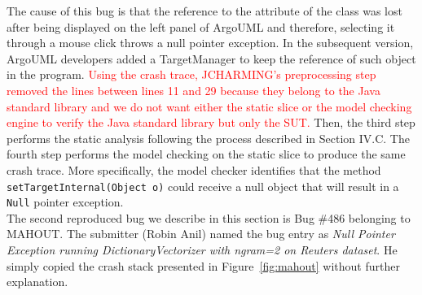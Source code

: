 \documentclass[times, doublespace]{smrauth}
\newcommand{\red}[1]{\textcolor{red}{#1}}
\begin{document}
The cause of this bug is that the reference to the attribute of
the class was lost after being displayed on the left panel of
ArgoUML and therefore, selecting it through a mouse click
throws a null pointer exception. In the subsequent version,
ArgoUML developers added a TargetManager to keep the
reference of such object in the program. \red{Using the crash trace, JCHARMING's preprocessing step
removed the lines between lines 11 and 29 because they
belong to the Java standard library and we do not want either
the static slice or the model checking engine to verify the
Java standard library but only the SUT.} Then, the third step
performs the static analysis following the process described in
Section IV.C. The fourth step performs the model checking on
the static slice to produce the same crash trace. More
specifically, the model checker identifies that the method
{\tt setTargetInternal(Object o)} could receive a null object that
will result in a {\tt Null} pointer exception. \\

The second reproduced bug we describe in this section is Bug \#486 belonging to MAHOUT. The submitter (Robin Anil) named the bug entry as {\it Null Pointer Exception running DictionaryVectorizer with ngram=2 on Reuters dataset}. He simply copied the crash stack presented in Figure~\ref{fig:mahout} without further explanation.
\end{document}
